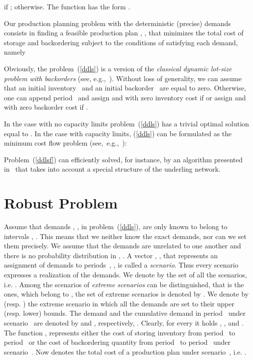 \documentclass[11pt]{article}
\begin{document}
if ;  otherwise.
The function has the form 
.


Our production planning problem with the deterministic (precise) demands consists in
finding a feasible production plan  ,
, that  minimizes the total cost of
storage and backordering subject to the conditions of satisfying each demand, namely

Obviously, the problem~(\ref{ddls}) is a version of the \emph{classical
dynamic lot-size problem with backorders} (see, e.g.,~\cite{WW58,FLK80}).
 Without loss of generality, we can assume that
an initial inventory~ and an initial backorder~
are equal to zero. Otherwise, one can append period~
and assign  and  
with zero inventory cost  
if  or 
assign  and 
with zero backorder cost
if . 

In the case with no capacity limits problem~(\ref{ddls})
has a trivial optimal solution equal to .
In the case with capacity limits, (\ref{ddls}) can be formulated as
the minimum cost flow problem 
(see,~e.g.,~\cite{AMO93}):

Problem~(\ref{ddlsf}) can  efficiently solved, for instance, by 
an algorithm presented in~\cite{AH08}
 that takes into account  a special structure of the underling network.

\section{Robust Problem}
\label{srob}
Assume that demands , , in problem~(\ref{ddls}), are 
only known to belong to intervals ,
.
This means that we neither know the exact 
demands, nor can we set them precisely. 
We assume that the demands are unrelated to one another
and there is no probability distribution in , .
 A vector , , that represents an assignment of demands  to periods~, , is
called a \emph{scenario}. Thus every scenario
  expresses a realization of the demands.
We denote by 
   the set of all the scenarios, i.e. .
   Among the scenarios of 
 \emph{extreme scenarios} can be distinguished,
 that is the ones, which belong to 
,
the set of extreme scenarios is denoted by .
We denote by  (resp. )
the extreme scenario in which all the demands
are set to their upper (resp. lower) bounds.
 The demand  and the cumulative demand in period~ 
 under scenario~ are denoted by 
  and , respectively,
 . Clearly, for every  it holds 
 , , and
 .
 The function 
 ,
 represents either the cost of storing inventory 
from period~ to period~
or  the cost of backordering quantity from period~ to
period~ under scenario~.
Now  denotes the total cost of 
a production plan  under scenario~, i.e.
.
\end{document}
